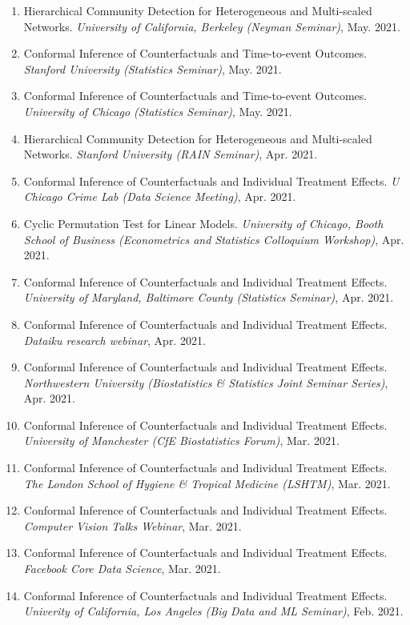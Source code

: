 \documentclass{article}
\begin{document}
\begin{enumerate}
\item Hierarchical Community Detection for Heterogeneous and Multi-scaled Networks. \emph{University of California, Berkeley (Neyman Seminar)}, May. 2021.
\item Conformal Inference of Counterfactuals and Time-to-event Outcomes. \emph{Stanford University (Statistics Seminar)}, May. 2021.
\item Conformal Inference of Counterfactuals and Time-to-event Outcomes. \emph{University of Chicago (Statistics Seminar)}, May. 2021.
\item Hierarchical Community Detection for Heterogeneous and Multi-scaled Networks. \emph{Stanford University (RAIN Seminar)}, Apr. 2021.
\item Conformal Inference of Counterfactuals and Individual Treatment Effects. \emph{U Chicago Crime Lab (Data Science Meeting)}, Apr. 2021.
\item Cyclic Permutation Test for Linear Models. \emph{University of Chicago, Booth School of Business (Econometrics and Statistics Colloquium Workshop)}, Apr. 2021.
\item Conformal Inference of Counterfactuals and Individual Treatment Effects. \emph{University of Maryland, Baltimore County (Statistics Seminar)}, Apr. 2021.
\item Conformal Inference of Counterfactuals and Individual Treatment Effects. \emph{Dataiku research webinar}, Apr. 2021.
\item Conformal Inference of Counterfactuals and Individual Treatment Effects. \emph{Northwestern University (Biostatistics \& Statistics Joint Seminar Series)}, Apr. 2021.
\item Conformal Inference of Counterfactuals and Individual Treatment Effects. \emph{University of Manchester (CfE Biostatistics Forum)}, Mar. 2021.
\item Conformal Inference of Counterfactuals and Individual Treatment Effects. \emph{The London School of Hygiene \& Tropical Medicine (LSHTM)}, Mar. 2021.
\item Conformal Inference of Counterfactuals and Individual Treatment Effects. \emph{Computer Vision Talks Webinar}, Mar. 2021.
\item Conformal Inference of Counterfactuals and Individual Treatment Effects. \emph{Facebook Core Data Science}, Mar. 2021.
\item Conformal Inference of Counterfactuals and Individual Treatment Effects. \emph{Univerity of California, Los Angeles (Big Data and ML Seminar)}, Feb. 2021.

\end{enumerate}
\end{document}

